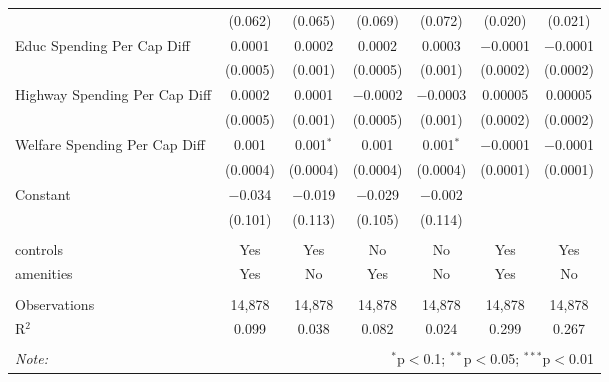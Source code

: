 \begin{table}[!htbp]
\begin{tabular}{@{\extracolsep{5pt}}lcccccc}
  & (0.062) & (0.065) & (0.069) & (0.072) & (0.020) & (0.021) \\ 
  Educ Spending Per Cap Diff & 0.0001 & 0.0002 & 0.0002 & 0.0003 & $-$0.0001 & $-$0.0001 \\ 
  & (0.0005) & (0.001) & (0.0005) & (0.001) & (0.0002) & (0.0002) \\ 
  Highway Spending Per Cap Diff & 0.0002 & 0.0001 & $-$0.0002 & $-$0.0003 & 0.00005 & 0.00005 \\ 
  & (0.0005) & (0.001) & (0.0005) & (0.001) & (0.0002) & (0.0002) \\ 
  Welfare Spending Per Cap Diff & 0.001 & 0.001$^{*}$ & 0.001 & 0.001$^{*}$ & $-$0.0001 & $-$0.0001 \\ 
  & (0.0004) & (0.0004) & (0.0004) & (0.0004) & (0.0001) & (0.0001) \\ 
  Constant & $-$0.034 & $-$0.019 & $-$0.029 & $-$0.002 &  &  \\ 
  & (0.101) & (0.113) & (0.105) & (0.114) &  &  \\ 
 \hline \\[-1.8ex] 
controls & Yes & Yes & No & No & Yes & Yes \\ 
amenities & Yes & No & Yes & No & Yes & No \\ 
\hline \\[-1.8ex] 
Observations & 14,878 & 14,878 & 14,878 & 14,878 & 14,878 & 14,878 \\ 
R$^{2}$ & 0.099 & 0.038 & 0.082 & 0.024 & 0.299 & 0.267 \\ 
\hline 
\hline \\[-1.8ex] 
\textit{Note:}  & \multicolumn{6}{r}{$^{*}$p$<$0.1; $^{**}$p$<$0.05; $^{***}$p$<$0.01} \\ 
\end{tabular} 
\end{table} 
